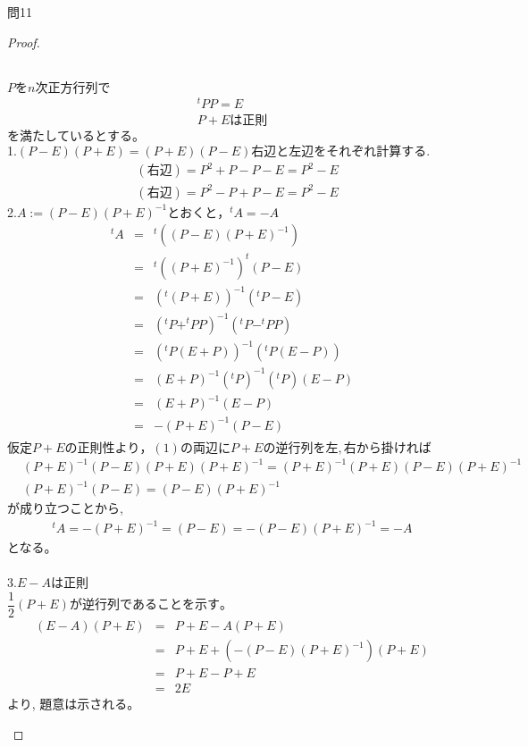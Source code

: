 \documentclass[dvipdfmx,uplatex,11pt]{jsarticle}
\begin{document}
\newpage

問11\\
\noindent
\begin{proof}
\begin{leftbar}
~\\
$Pをn次正方行列で$
\begin{eqnarray*}
^t PP=E\\
P+Eは正則
\end{eqnarray*}
$を満たしているとする。$\\
1.$(P − E)(P + E) = (P + E)(P − E)右辺と左辺をそれぞれ計算する.$
\begin{eqnarray*}
& (右辺) = P^2+P−P−E=P^2−E\\
& (右辺) = P^2−P+P−E=P^2−E
\end{eqnarray*}
2.$A := (P − E)(P + E)^{−1}とおくと，^tA=−A$
\begin{eqnarray*}
^tA&=&^t((P−E)(P+E)^{−1})\\
&=&^t((P+E)^{-1})^t(P−E)\\
&=&(^t(P+E))^{-1}(^tP−E)\\
&=&(^tP+^tPP)^{-1}(^tP−^tPP)\\
&=&(^tP(E + P))^{-1}(^tP(E − P))\\
&=&(E + P)^{−1}(^tP)^{−1}(^tP)(E − P)\\
&=&(E + P)^{−1}(E − P)\\
&=&−(P + E)^{−1}(P − E)\\
\end{eqnarray*}
$仮定P+Eの正則性より，(1)の両辺にP+Eの逆行列を左, 右から掛ければ$
\begin{eqnarray*}
& (P + E)^{-1}(P − E)(P + E)(P + E)^{−1}=(P + E)^{−1}(P + E)(P − E)(P + E)^{−1}\\
& (P + E)^{−1}(P − E)=(P − E)(P + E)^{−1}
\end{eqnarray*}
が成り立つことから,
\begin{eqnarray*}
^tA = −(P + E)^{−1}=(P − E) = −(P − E)(P + E)^{−1}= −A
\end{eqnarray*}
となる。\\
\\
3.$E − A は正則$\\
$\dfrac{1}{2}(P + E) が逆行列であることを示す。$
\begin{eqnarray*}
(E−A)(P+E)&=&P+E−A(P+E)\\
&=&P+E+(−(P − E)(P + E)^{−1})(P + E)\\
&=&P+E−P+E \\
&=&2E
\end{eqnarray*}
より, 題意は示される。
\end{leftbar}

\end{proof}
\end{document}
